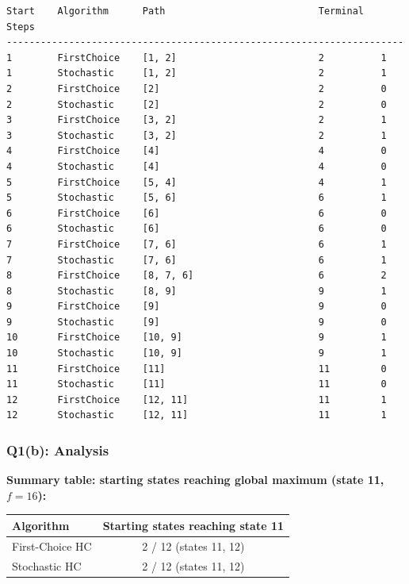 \documentclass[12pt,a4paper]{article}
\begin{document}
\begin{lstlisting}[style=output]
Start    Algorithm      Path                           Terminal   Steps
----------------------------------------------------------------------
1        FirstChoice    [1, 2]                         2          1
1        Stochastic     [1, 2]                         2          1
2        FirstChoice    [2]                            2          0
2        Stochastic     [2]                            2          0
3        FirstChoice    [3, 2]                         2          1
3        Stochastic     [3, 2]                         2          1
4        FirstChoice    [4]                            4          0
4        Stochastic     [4]                            4          0
5        FirstChoice    [5, 4]                         4          1
5        Stochastic     [5, 6]                         6          1
6        FirstChoice    [6]                            6          0
6        Stochastic     [6]                            6          0
7        FirstChoice    [7, 6]                         6          1
7        Stochastic     [7, 6]                         6          1
8        FirstChoice    [8, 7, 6]                      6          2
8        Stochastic     [8, 9]                         9          1
9        FirstChoice    [9]                            9          0
9        Stochastic     [9]                            9          0
10       FirstChoice    [10, 9]                        9          1
10       Stochastic     [10, 9]                        9          1
11       FirstChoice    [11]                           11         0
11       Stochastic     [11]                           11         0
12       FirstChoice    [12, 11]                       11         1
12       Stochastic     [12, 11]                       11         1
\end{lstlisting}

\subsubsection*{Q1(b): Analysis}

\textbf{Summary table: starting states reaching global maximum (state 11, $f=16$):}

\begin{center}
\begin{tabular}{lc}
\toprule
Algorithm & Starting states reaching state 11 \\
\midrule
First-Choice HC & 2 / 12 (states 11, 12) \\
Stochastic HC   & 2 / 12 (states 11, 12) \\
\bottomrule
\end{tabular}
\end{center}
\end{document}
